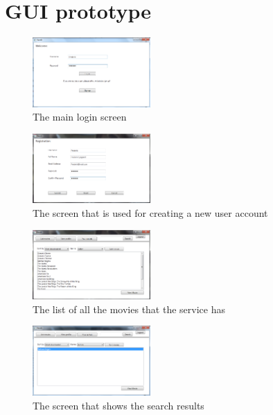 \section{GUI prototype}
\label{Appendix_GUI_Prototype}
\clearpage
\begin{figure}[!ht]
  \centering
    \includegraphics[width=0.4\textwidth]{Parts/Appendix/Images/Login}
  \caption{The main login screen}
  \label{fig:Appendix_GUI_PrototypeLogin}
\end{figure}
\begin{figure}[!ht]
  \centering
    \includegraphics[width=0.4\textwidth]{Parts/Appendix/Images/Signup}
  \caption{The screen that is used for creating a new user account}
  \label{fig:Appendix_GUI_PrototypeSignup}
\end{figure}
\begin{figure}[!ht]
  \centering
    \includegraphics[width=0.4\textwidth]{Parts/Appendix/Images/Listmovies}
  \caption{The list of all the movies that the service has}
  \label{fig:Appendix_GUI_PrototypeAllmovies}
\end{figure}
\begin{figure}[h!]
  \centering
    \includegraphics[width=0.4\textwidth]{Parts/Appendix/Images/Search}
  \caption{The screen that shows the search results}
  \label{fig:Appendix_GUI_PrototypeSearch}
\end{figure}
